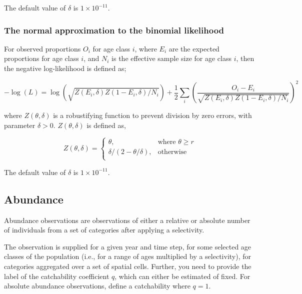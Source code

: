 The default value of $\delta$ is $1 \times 10^{-11}$.

\subsubsection*{The normal approximation to the binomial likelihood}

For observed proportions $O_i$ for age class $i$, where $E_i$ are the expected proportions for age class $i$, and $N_i$ is the effective sample size for age class $i$, then the negative log-likelihood is defined as;  

\begin{equation}
  -\log \left(L \right)= \log \left( \sqrt{Z\left(E_i,\delta \right)Z\left(1-E_i,\delta\right)/N_i} \right)     + \frac{1}{2} \sum\limits_i\left( \frac{O_i-E_i}{\sqrt{Z\left(E_i,\delta\right)Z\left(1-E_i,\delta \right)/N_i}} \right)^2
\end{equation}

where $Z \left(\theta,\delta \right)$ is a robustifying function to prevent division by zero errors, with parameter $\delta>0$. $Z \left(\theta,\delta \right)$ is defined as,

\begin{equation}
   Z \left(\theta,\delta \right) = \begin{cases}
	  \theta, & \text{where $\theta \ge r$} \\
	  \delta/\left( 2-\theta/\delta \right), & \text{otherwise} \\  
  \end{cases}
\end{equation}

The default value of $\delta$ is $1 \times 10^{-11}$.

\subsection{Abundance}

Abundance observations are observations of either a relative or absolute number of individuals from a set of categories after applying a selectivity. 

The observation is supplied for a given year and time step, for some selected age classes of the population (i.e., for a range of ages multiplied by a selectivity), for categories aggregated over a set of spatial cells. Further, you need to provide the label of the catchability coefficient $q$, which can either be estimated of fixed. For absolute abundance observations, define a catchability where $q=1$.

